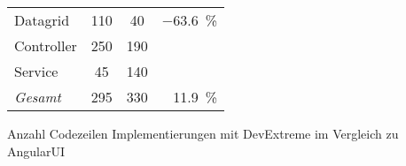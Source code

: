 \begin{tabular}{@{}lSSR@{}}
\toprule
		&  &  & \\
\midrule
	Datagrid		&	110	&	 40 & \SI{-63,6}{\percent} \\
\midrule[.2pt]
	Controller		&	250	&  	190 & \\
	Service			&	 45	&  	140 & \\
	\emph{Gesamt}	&  	295	&   330 & \SI{11,9}{\percent} \\
\bottomrule
\end{tabular} 
\caption{Anzahl Codezeilen Implementierungen mit DevExtreme im Vergleich zu AngularUI}
